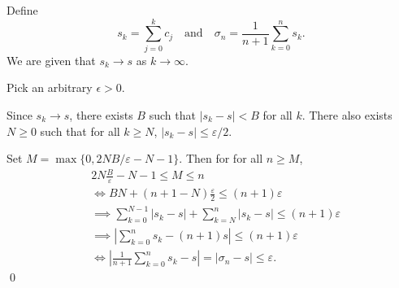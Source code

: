 \documentclass[oneside]{article}
\newcommand\abs[1]{\left|#1\right|}
\begin{document}
  Define \[
      s_k = \sum_{j=0}^k c_j \quad\text{and}\quad
      \sigma_n = \frac1{n+1}\sum_{k=0}^n s_k \text{.}
  \] We are given that $s_k \to s$ as $k \to \infty$.

  Pick an arbitrary $\epsilon > 0$.

  Since $s_k \to s$, there exists $B$ such that $\abs{s_k - s} < B$ for all $k$.
  There also exists $N \geq 0$ such that for all $k \geq N$,
  $\abs{s_k - s} \leq \varepsilon/2$.

  Set $M = \max\{0, 2NB/\varepsilon - N - 1\}$. Then for for all $n \geq M$,
  \begin{align*}
    &2N\frac{B}{\varepsilon} - N - 1 \leq M \leq n \\
    &\iff BN + (n + 1 - N)\frac{\varepsilon}{2} \leq (n + 1)\varepsilon \\
    &\implies \sum_{k=0}^{N-1} \abs{s_k -s} + \sum_{k=N}^{n} \abs{s_k -s}
    \leq (n + 1)\varepsilon \\
    &\implies \abs{\sum_{k=0}^{n} s_k -(n+1)s} \leq (n + 1)\varepsilon \\
    &\iff \abs{\frac{1}{n+1}\sum_{k=0}^{n} s_k -s}
    = \abs{\sigma_n - s} \leq \varepsilon \text{.}
  \end{align*}\qed
\end{document}
